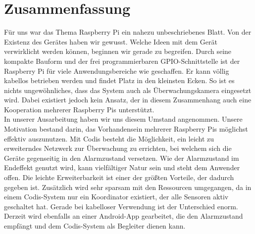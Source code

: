 \documentclass[journal]{IEEEtran}
\begin{document}
\section{Zusammenfassung}
Für uns war das Thema Raspberry Pi ein nahezu unbeschriebenes Blatt. Von der Existenz des Gerätes haben wir gewusst. Welche Ideen mit dem Gerät verwirklicht werden können, beginnen wir gerade zu begreifen. Durch seine kompakte Bauform und der frei programmierbaren GPIO-Schnittstelle ist der Raspberry Pi für viele Anwendungsbereiche wie geschaffen. Er kann völlig kabellos betrieben werden und findet Platz in den kleinsten Ecken. So ist es nichts ungewöhnliches, dass das System auch als Überwachungskamera eingesetzt wird. Dabei existiert jedoch kein Ansatz, der in diesem Zusammenhang auch eine Kooperation mehrerer Raspberry Pis unterstützt. \\In unserer Ausarbeitung haben wir uns diesem Umstand angenommen. Unsere Motivation bestand darin, das Vorhandensein mehrerer Raspberry Pis möglichst effektiv auszunutzen. Mit Codis besteht die Möglichkeit, ein leicht zu erweiterndes Netzwerk zur Überwachung zu errichten, bei welchem sich die Geräte gegenseitig in den Alarmzustand versetzen. Wie der Alarmzustand im Endeffekt genutzt wird, kann vielfältiger Natur sein und steht dem Anwender offen. Die leichte Erweiterbarkeit ist einer der größten Vorteile, der dadurch gegeben ist. Zusätzlich wird sehr sparsam mit den Ressourcen umgegangen, da in einem Codis-System nur ein Koordinator existiert, der alle Sensoren aktiv geschaltet hat. Gerade bei kabelloser Verwendung ist der Unterschied enorm. Derzeit wird ebenfalls an einer Android-App gearbeitet, die den Alarmzustand empfängt und dem Codis-System als Begleiter dienen kann.



\printbibliography
\end{document}
